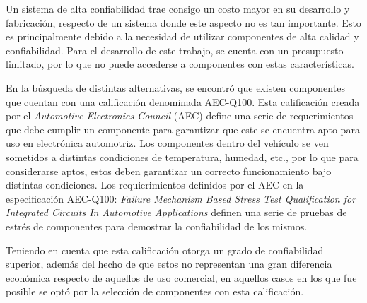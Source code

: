 Un sistema de alta confiabilidad trae consigo un costo mayor en su desarrollo y fabricación, respecto de un sistema donde este aspecto no es tan importante. Esto es principalmente debido a la necesidad de utilizar componentes de alta calidad y confiabilidad. Para el desarrollo de este trabajo, se cuenta con un presupuesto limitado, por lo que no puede accederse a componentes con estas características.

En la búsqueda de distintas alternativas, se encontró que existen componentes que cuentan con una calificación denominada AEC-Q100. Esta calificación creada por el \textit{Automotive Electronics Council} (AEC) define una serie de requerimientos que debe cumplir un componente para garantizar que este se encuentra apto para uso en electrónica automotriz. 
Los componentes dentro del vehículo se ven sometidos a distintas condiciones de temperatura, humedad, etc., por lo que para considerarse aptos, estos deben garantizar un correcto funcionamiento bajo distintas condiciones. Los requierimientos definidos por el AEC en la especificación AEC-Q100: \textit{Failure Mechanism Based Stress Test Qualification for Integrated Circuits In Automotive Applications} definen una serie de pruebas de estrés de componentes para demostrar la confiabilidad de los mismos.

Teniendo en cuenta que esta calificación otorga un grado de confiabilidad superior, además del hecho de que estos no representan una gran diferencia económica respecto de aquellos de uso comercial, en aquellos casos en los que fue posible se optó por la selección de componentes con esta calificación.













